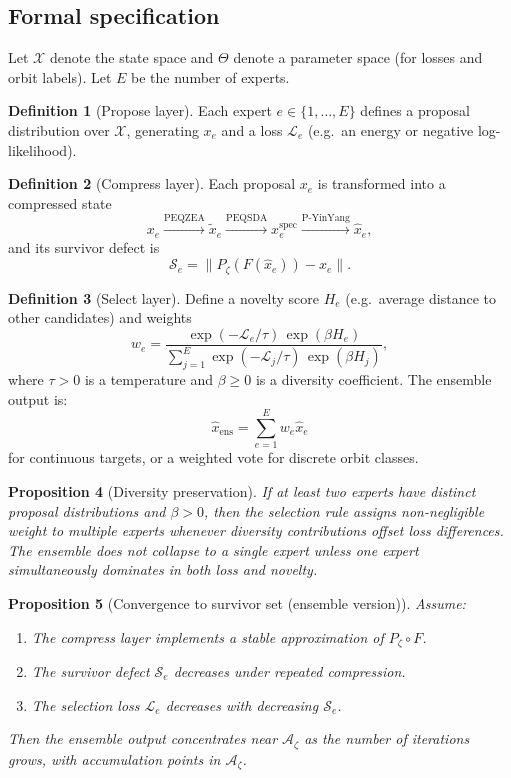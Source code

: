 \documentclass[11pt]{article}
\theoremstyle{definition}
\newtheorem{definition}{Definition}[section]
\theoremstyle{plain}
\newtheorem{proposition}[definition]{Proposition}
\theoremstyle{remark}
\newcommand{\Azet}{\mathcal{A}_\zeta}
\newcommand{\Xc}{\mathcal{X}}
\begin{document}
\subsection{Formal specification}

Let $\Xc$ denote the state space and $\Theta$ denote a parameter space (for losses and orbit labels). Let $E$ be the number of experts.

\begin{definition}[Propose layer]
Each expert $e\in\{1,\dots,E\}$ defines a proposal distribution over $\Xc$, generating $x_e$ and a loss $\mathcal{L}_e$ (e.g.\ an energy or negative log-likelihood).
\end{definition}

\begin{definition}[Compress layer]
Each proposal $x_e$ is transformed into a compressed state
\[
x_e \xrightarrow{\text{PEQZEA}} \tilde{x}_e \xrightarrow{\text{PEQSDA}} x_e^{\mathrm{spec}} \xrightarrow{\text{P-YinYang}} \hat{x}_e,
\]
and its survivor defect is
\[
\mathcal{S}_e = \|P_\zeta(F(\hat{x}_e)) - \hat{x}_e\|.
\]
\end{definition}

\begin{definition}[Select layer]
Define a novelty score $H_e$ (e.g.\ average distance to other candidates) and weights
\[
w_e = \frac{\exp(-\mathcal{L}_e/\tau)\,\exp(\beta H_e)}
{\sum_{j=1}^E \exp(-\mathcal{L}_j/\tau)\,\exp(\beta H_j)},
\]
where $\tau>0$ is a temperature and $\beta\ge 0$ is a diversity coefficient. The ensemble output is:
\[
\hat{x}_{\mathrm{ens}} = \sum_{e=1}^E w_e \hat{x}_e
\]
for continuous targets, or a weighted vote for discrete orbit classes.
\end{definition}

\begin{proposition}[Diversity preservation]
If at least two experts have distinct proposal distributions and $\beta>0$, then the selection rule assigns non-negligible weight to multiple experts whenever diversity contributions offset loss differences. The ensemble does not collapse to a single expert unless one expert simultaneously dominates in both loss and novelty.
\end{proposition}

\begin{proposition}[Convergence to survivor set (ensemble version)]
Assume:
\begin{enumerate}[label=(\alph*)]
  \item The compress layer implements a stable approximation of $P_\zeta \circ F$.
  \item The survivor defect $\mathcal{S}_e$ decreases under repeated compression.
  \item The selection loss $\mathcal{L}_e$ decreases with decreasing $\mathcal{S}_e$.
\end{enumerate}
Then the ensemble output concentrates near $\Azet$ as the number of iterations grows, with accumulation points in $\Azet$.
\end{proposition}
\end{document}

